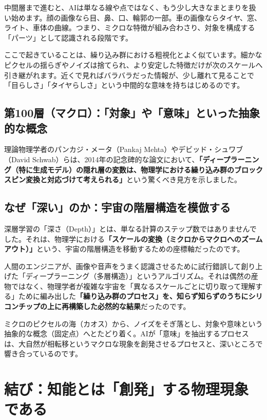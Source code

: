 中間層まで進むと、AIは単なる線や点ではなく、もう少し大きなまとまりを扱い始めます。顔の画像なら目、鼻、口、輪郭の一部。車の画像ならタイヤ、窓、ライト、車体の曲線。つまり、ミクロな特徴が組み合わさり、対象を構成する「パーツ」として認識される段階です。

ここで起きていることは、繰り込み群における粗視化とよく似ています。細かなピクセルの揺らぎやノイズは捨てられ、より安定した特徴だけが次のスケールへ引き継がれます。近くで見ればバラバラだった情報が、少し離れて見ることで「目らしさ」「タイヤらしさ」という中間的な意味を持ちはじめるのです。

\subsection{第100層（マクロ）：「対象」や「意味」といった抽象的な概念}

理論物理学者のパンカジ・メータ（Pankaj Mehta）やデビッド・シュワブ（David Schwab）らは、2014年の記念碑的な論文において、\textbf{「ディープラーニング（特に生成モデル）の隠れ層の変数は、物理学における繰り込み群のブロックスピン変換と対応づけて考えられる」}という驚くべき見方を示しました。

\subsection{なぜ「深い」のか：宇宙の階層構造を模倣する}

深層学習の「深さ（Depth）」とは、単なる計算のステップ数ではありませんでした。それは、物理学における\textbf{「スケールの変換（ミクロからマクロへのズームアウト）」}という、宇宙の階層構造を移動するための座標軸だったのです。

人間のエンジニアが、画像や音声をうまく認識させるために試行錯誤して創り上げた「ディープラーニング（多層構造）」というアルゴリズム。それは偶然の産物ではなく、物理学者が複雑な宇宙を「異なるスケールごとに切り取って理解する」ために編み出した\textbf{「繰り込み群のプロセス」を、知らず知らずのうちにシリコンチップの上に再構築した必然的な結果}だったのです。

ミクロのピクセルの海（カオス）から、ノイズをそぎ落とし、対象や意味という抽象的な概念（固定点）へとたどり着く。AIが「意味」を抽出するプロセスは、大自然が相転移というマクロな現象を創発させるプロセスと、深いところで響き合っているのです。

\section{結び：知能とは「創発」する物理現象である}

